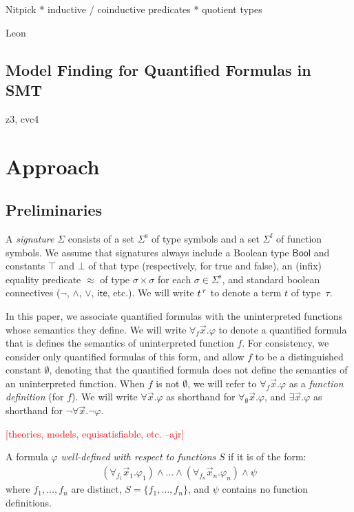 \documentclass[runningheads,a4paper]{llncs}
\newcommand{\con}[1]{\mathsf{#1}}
\newcommand{\teq}{\approx}
\newcommand{\ssorts}[1]{#1^\mathrm{s}}
\newcommand{\sfuns}[1]{#1^\mathrm{f}}
\newcommand{\Bool}{\con{Bool}}
\newcommand{\ltrue}{\top}
\newcommand{\lfalse}{\bot}
\newcommand{\lite}{\con{ite}}
\newcommand{\forallf}[1]{\forall_{#1}}
\newcommand{\fnull}{\emptyset}
\newcommand{\rem}[1]{\textcolor{red}{[#1]}}
\newcommand{\ajr}[1]{\rem{#1 --ajr}}
\newcommand{\vthinspace}{\kern+0.083333em}
\newcommand{\typ}[1]{^{\vthinspace #1}}
\begin{document}
Nitpick
  * inductive / coinductive predicates
  * quotient types

Leon

\subsection{Model Finding for Quantified Formulas in SMT}

z3, cvc4


\section{Approach}

\subsection{Preliminaries}
\label{sec:prelim}

A \emph{signature} $\Sigma$ consists of 
a set $\ssorts{\Sigma}$ of type symbols and
a set $\sfuns{\Sigma}$ of function symbols.
We assume that signatures always include a Boolean type $\Bool$ and constants 
$\ltrue$ and $\lfalse$ of that type (respectively, for true and false), 
an (infix) equality predicate $\teq$ of type $\sigma \times \sigma$ for each $\sigma \in \ssorts{\Sigma}$,
and standard boolean connectives ($\neg$, $\wedge$, $\vee$, $\lite$, etc.).
We will write $t\typ{\tau}$ to denote a term $t$ of type~$\tau$.

In this paper, we associate quantified formulas with the uninterpreted functions whose semantics they define.
We will write $\forallf{f} \vec x. \varphi$ to denote a quantified formula that is defines the semantics of uninterpreted function $f$.
For consistency, we consider only quantified formulas of this form, 
and allow $f$ to be a distinguished constant $\fnull$, 
denoting that the quantified formula does not define the semantics of an uninterpreted function.
When $f$ is not $\fnull$, we will refer to $\forallf{f} \vec x. \varphi$ as a \emph{function definition} (for $f$).
We will write $\forall \vec x. \varphi$ as shorthand for $\forallf{\fnull} \vec x. \varphi$,
and $\exists \vec x. \varphi$ as shorthand for $\neg \forall \vec x. \neg \varphi$.

\ajr{theories, models, equisatisfiable, etc.}


\begin{definition}
A formula $\varphi$ \emph{well-defined with respect to functions} $S$ if it is of the form:
\begin{eqnarray} \label{eq:wdf}
(\forallf{f_1} \vec x_1. \varphi_1) \wedge \ldots \wedge (\forallf{f_n} \vec x_n. \varphi_n) \wedge \psi
\end{eqnarray}
where $f_1, \ldots, f_n$ are distinct, 
$S = \{ f_1, \ldots, f_n \}$,
and $\psi$ contains no function definitions.
\end{definition}
\end{document}
